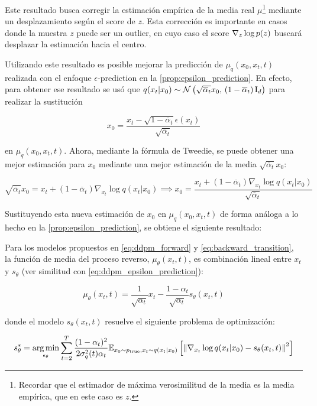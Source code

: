 Este resultado busca corregir la estimación empírica de la media real $\mu$\footnote{Recordar que el estimador de máxima verosimilitud de la media es la media empírica, que en este caso es $z$.} mediante un desplazamiento según el score de $z$. Esta corrección es importante en casos donde la muestra $z$ puede ser un outlier, en cuyo caso el score $\nabla_{z} \log p(z)$ buscará desplazar la estimación hacia el centro.

Utilizando este resultado es posible mejorar la predicción de $\mu_q(x_0,x_t,t)$ realizada con el enfoque $\epsilon$-prediction en la \autoref{prop:epsilon_prediction}. En efecto, para obtener ese resultado se usó que $q(x_t|x_0)\sim\mathcal{N}\left(\sqrt{\overline{\alpha}_t}x_0,\,(1-\overline{\alpha}_t)\operatorname{I}_{d}\right)$ para realizar la sustitución

\begin{equation}
    \label{eq:x0_epsilon_prediction}
    x_0 = \frac{x_t - \sqrt{1-\overline{\alpha}_t}\epsilon(x_t)}{\sqrt{\overline{\alpha}_t}}
\end{equation}

en $\mu_q(x_0,x_t,t)$. Ahora, mediante la fórmula de Tweedie, se puede obtener una mejor estimación para $x_0$ mediante una mejor estimación de la media $\sqrt{\overline{\alpha}_t}x_0$:

\begin{equation}
    \label{eq:x0_tweedie}
    \sqrt{\overline{\alpha}_t}x_0 = x_t+(1-\overline{\alpha}_t)\nabla_{x_t}\log q(x_t|x_0) \implies x_0 = \frac{x_t+(1-\overline{\alpha}_t)\nabla_{x_t}\log q(x_t|x_0)}{\sqrt{\overline{\alpha}_t}}
\end{equation}

Sustituyendo esta nueva estimación de $x_0$ en $\mu_q(x_0,x_t,t)$ de forma análoga a lo hecho en la \autoref{prop:epsilon_prediction}, se obtiene el siguiente resultado:

\begin{prop}
    \label{prop:score_prediction}
    Para los modelos propuestos en \eqref{eq:ddpm_forward} y \eqref{eq:backward_transition}, la función de media del proceso reverso, $\mu_\theta(x_t,t)$, es combinación lineal entre $x_t$ y $s_\theta$ (ver similitud con \eqref{eq:ddpm_epsilon_prediction}):

    \begin{equation*}
        \mu_\theta(x_t,t) = \frac{1}{\sqrt{\alpha_t}}x_t - \frac{1-\alpha_t}{\sqrt{\alpha_t}}s_\theta(x_t,t)
    \end{equation*}

    donde el modelo $s_\theta(x_t,t)$ resuelve el siguiente problema de optimización:

    \begin{equation*}
        s_\theta^*=\operatorname*{arg\,min}_{\epsilon_\theta} \sum_{t=2}^T \frac{(1-\alpha_t)^2}{2\sigma_q^2(t)\alpha_t} \mathbb{E}_{x_0\sim p_{\operatorname{true}}, x_t\sim q(x_t|x_0)}\left[\left\lVert \nabla_{x_t}\log q(x_t|x_0) - s_\theta(x_t,t) \right\rVert^2\right]
    \end{equation*}
\end{prop}

